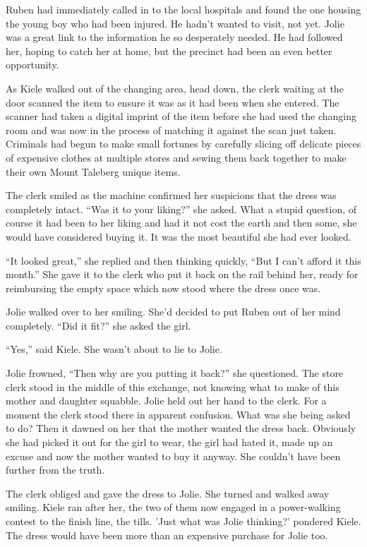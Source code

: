 Ruben had immediately called in to the local hospitals and found the one housing the young boy who had been injured.  He hadn't wanted to visit, not yet.  Jolie was a great link to the information he so desperately needed.  He had followed her, hoping to catch her at home, but the precinct had been an even better opportunity.



\thoughtbreak



As Kiele walked out of the changing area, head down, the clerk waiting at the door scanned the item to ensure it was as it had been when she entered.  The scanner had taken a digital imprint of the item before she had used the changing room and was now in the process of matching it against the scan just taken.  Criminals had begun to make small fortunes by carefully slicing off delicate pieces of expensive clothes at multiple stores and sewing them back together to make their own Mount Taleberg unique items.  

The clerk smiled as the machine confirmed her suspicions that the dress was completely intact.  ``Was it to your liking?'' she asked.  What a stupid question, of course it had been to her liking and had it not cost the earth and then some, she would have considered buying it.  It was the most beautiful she had ever looked.

``It looked great,'' she replied and then thinking quickly,  ``But I can't afford it this month.''  She gave it to the clerk who put it back on the rail behind her, ready for reimbursing the empty space which now stood where the dress once was.

Jolie walked over to her smiling.  She'd decided to put Ruben out of her mind completely.  ``Did it fit?'' she asked the girl.  

``Yes,'' said Kiele.  She wasn't about to lie to Jolie.  

Jolie frowned, ``Then why are you putting it back?'' she questioned.  The store clerk stood in the middle of this exchange, not knowing what to make of this mother and daughter squabble.  Jolie held out her hand to the clerk.  For a moment the clerk stood there in apparent confusion.  What was she being asked to do?  Then it dawned on her that the mother wanted the dress back.  Obviously she had picked it out for the girl to wear, the girl had hated it, made up an excuse and now the mother wanted to buy it anyway.  She couldn't have been further from the truth.

The clerk obliged and gave the dress to Jolie.  She turned and walked away smiling.  Kiele ran after her, the two of them now engaged in a power-walking contest to the finish line, the tills.  'Just what was Jolie thinking?' pondered Kiele.  The dress would have been more than an expensive purchase for Jolie too.


